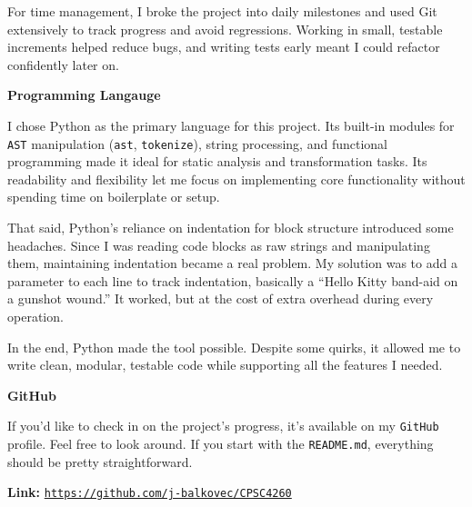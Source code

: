 \documentclass[12pt, letterpaper]{article}
\begin{document}
\quad For time management, I broke the project into daily milestones and used Git extensively to track progress and avoid regressions. Working in small, testable increments helped reduce bugs, and writing tests early meant I could refactor confidently later on.

\vspace{0.5em}
\noindent\makebox[\linewidth]{\rule{\linewidth}{0.4pt}}
\vspace{-1.7em}
\begin{center}
\textbf{\large Programming Langauge}
\end{center}
\vspace{-0.3em}
\noindent\makebox[\linewidth]{\rule{\linewidth}{0.4pt}}
\vspace{0.5em}

\quad I chose Python as the primary language for this project. Its built-in modules for \texttt{AST} manipulation (\lstinline{ast}, \lstinline{tokenize}), string processing, and functional programming made it ideal for static analysis and transformation tasks. Its readability and flexibility let me focus on implementing core functionality without spending time on boilerplate or setup.

\quad That said, Python’s reliance on indentation for block structure introduced some headaches. Since I was reading code blocks as raw strings and manipulating them, maintaining indentation became a real problem. My solution was to add a parameter to each line to track indentation, basically a “Hello Kitty band-aid on a gunshot wound.” It worked, but at the cost of extra overhead during every operation.

\quad In the end, Python made the tool possible. Despite some quirks, it allowed me to write clean, modular, testable code while supporting all the features I needed.

\newpage
\vspace{0.5em}
\noindent\makebox[\linewidth]{\rule{\linewidth}{0.4pt}}
\vspace{-1.7em}
\begin{center}
\textbf{\large GitHub}
\end{center}
\vspace{-0.3em}
\noindent\makebox[\linewidth]{\rule{\linewidth}{0.4pt}}
\vspace{0.5em}

If you'd like to check in on the project's progress, it's available on my \texttt{GitHub} profile. Feel free to look around. If you start with the \texttt{README.md}, everything should be pretty straightforward.

\noindent\textbf{Link:} \href{https://github.com/j-balkovec/CPSC4260}{\texttt{https://github.com/j-balkovec/CPSC4260}}

\end{document}
